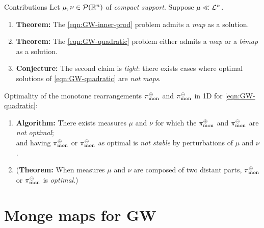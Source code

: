 \documentclass[9pt,xcolor={dvipsnames}]{beamer}
\begin{document}
\begin{frame}{Contributions}
    Let $\mu, \nu\in \mathcal{P}(\mathbb{R}^n)$ of \emph{compact support}. Suppose $\mu\ll\mathcal{L}^n$.
    \begin{enumerate}
        \item \textbf{Theorem:} The \cref{eqn:GW-inner-prod} problem admits a \emph{map} as a solution.
        \item \textbf{Theorem:} The \cref{eqn:GW-quadratic} problem either admits a \emph{map} or a \emph{bimap} as a solution.
        \item \textbf{Conjecture:} The second claim is \emph{tight}: there exists cases where optimal solutions of \cref{eqn:GW-quadratic} are \emph{not maps}.
    \end{enumerate}
    Optimality of the monotone rearrangements $\pi_\text{mon}^\oplus$ and $\pi_\text{mon}^\ominus$ in 1D for \cref{eqn:GW-quadratic}:
    \vspace{-5mm}
    \begin{enumerate}\addtocounter{enumi}{3}
        \item \textbf{Algorithm:} There exists measures $\mu$ and $\nu$ for which the $\pi_\text{mon}^\oplus$ and $\pi_\text{mon}^\ominus$ are \emph{not optimal};\\
        and having $\pi_\text{mon}^\oplus$ or $\pi_\text{mon}^\ominus$ as optimal is \emph{not stable} by perturbations of $\mu$ and $\nu$.
        \item (\textbf{Theorem:} When measures $\mu$ and $\nu$ are composed of two distant parts, $\pi_\text{mon}^\oplus$ or $\pi_\text{mon}^\ominus$ is \emph{optimal}.)
    \end{enumerate}
\end{frame}


\section{Monge maps for GW}
\end{document}
